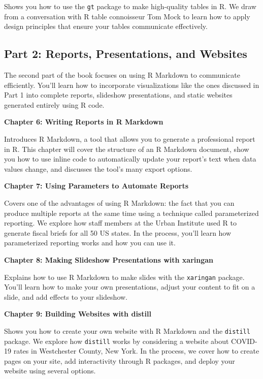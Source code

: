 \documentclass[
]{book}
\begin{document}
Shows you how to use the \texttt{gt} package to make high-quality tables in R. We draw from a conversation with R table connoisseur Tom Mock to learn how to apply design principles that ensure your tables communicate effectively.

\hypertarget{part-2-reports-presentations-and-websites}{%
\subsection*{Part 2: Reports, Presentations, and Websites}\label{part-2-reports-presentations-and-websites}}

The second part of the book focuses on using R Markdown to communicate efficiently. You'll learn how to incorporate visualizations like the ones discussed in Part 1 into complete reports, slideshow presentations, and static websites generated entirely using R code.

\textbf{Chapter 6: Writing Reports in R Markdown}

Introduces R Markdown, a tool that allows you to generate a professional report in R. This chapter will cover the structure of an R Markdown document, show you how to use inline code to automatically update your report's text when data values change, and discusses the tool's many export options.

\textbf{Chapter 7: Using Parameters to Automate Reports}

Covers one of the advantages of using R Markdown: the fact that you can produce multiple reports at the same time using a technique called parameterized reporting. We explore how staff members at the Urban Institute used R to generate fiscal briefs for all 50 US states. In the process, you'll learn how parameterized reporting works and how you can use it.

\textbf{Chapter 8: Making Slideshow Presentations with xaringan}

Explains how to use R Markdown to make slides with the \texttt{xaringan} package. You'll learn how to make your own presentations, adjust your content to fit on a slide, and add effects to your slideshow.

\textbf{Chapter 9: Building Websites with distill}

Shows you how to create your own website with R Markdown and the \texttt{distill} package. We explore how \texttt{distill} works by considering a website about COVID-19 rates in Westchester County, New York. In the process, we cover how to create pages on your site, add interactivity through R packages, and deploy your website using several options.
\end{document}
